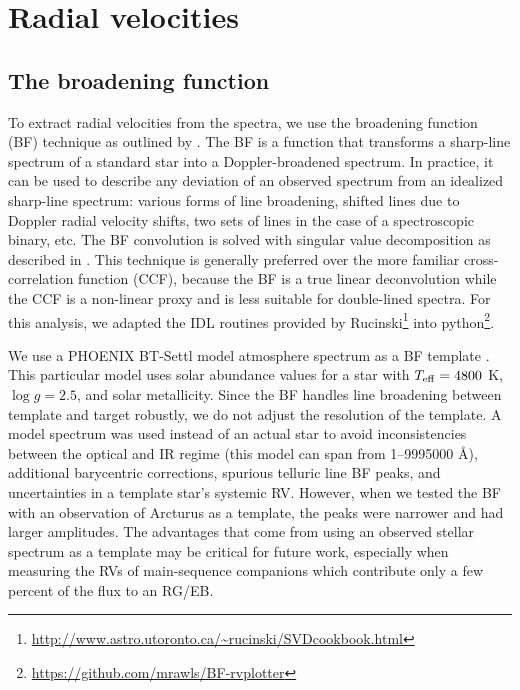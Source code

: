 \section{Radial velocities}\label{rvs}
\subsection{The broadening function}\label{bf}
To extract radial velocities from the spectra, we use the broadening function (BF) technique as outlined by \citet{ruc02}. The BF is a function that transforms a sharp-line spectrum of a standard star into a Doppler-broadened spectrum. In practice, it can be used to describe any deviation of an observed spectrum from an idealized sharp-line spectrum: various forms of line broadening, shifted lines due to Doppler radial velocity shifts, two sets of lines in the case of a spectroscopic binary, etc. The BF convolution is solved with singular value decomposition as described in \citet{ruc02}. This technique is generally preferred over the more familiar cross-correlation function (CCF), because the BF is a true linear deconvolution while the CCF is a non-linear proxy and is less suitable for double-lined spectra. For this analysis, we adapted the IDL routines provided by Rucinski\footnote{\url{http://www.astro.utoronto.ca/~rucinski/SVDcookbook.html}} into python\footnote{\url{https://github.com/mrawls/BF-rvplotter}}.

We use a PHOENIX BT-Settl model atmosphere spectrum as a BF template \citep{all03}. This particular model uses \citet{Asplund_2009} solar abundance values for a star with $T_{\rm{eff}} = 4800$ K, $\log g = 2.5$, and solar metallicity. Since the BF handles line broadening between template and target robustly, we do not adjust the resolution of the template. A model spectrum was used instead of an actual star to avoid inconsistencies between the optical and IR regime (this model can span from 1--9995000 \AA), additional barycentric corrections, spurious telluric line BF peaks, and uncertainties in a template star's systemic RV. However, when we tested the BF with an observation of Arcturus as a template, the peaks were narrower and had larger amplitudes. The advantages that come from using an observed stellar spectrum as a template may be critical for future work, especially when measuring the RVs of main-sequence companions which contribute only a few percent of the flux to an RG/EB.

